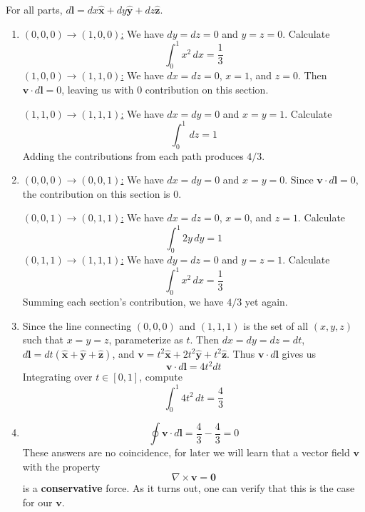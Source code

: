 \documentclass[a4paper]{article}
\begin{document}
For all parts, \( d \pmb{l} = dx \pmb{\hat{x}} + dy \pmb{\hat{y}} + dz \pmb{\hat{z}} \).

\begin{enumerate}[label=(\alph*)]
	\item \underline{\( \!\left( 0,0,0 \right) \rightarrow \!\left( 1,0,0 \right) \):} We have \( dy = dz = 0 \) and \( y = z = 0 \). Calculate
	\[
		\int^{1}_{0} x^{2} \, dx = \frac{1}{3}
	\]
	\underline{\( \!\left( 1,0,0 \right) \rightarrow \!\left( 1,1,0 \right) \):} We have \( dx = dz = 0 \), \( x = 1 \), and \( z = 0 \). Then \( \pmb{v} \cdot d \pmb{l} = 0 \), leaving us with \( 0 \) contribution on this section.

	\underline{\( \!\left( 1,1,0 \right) \rightarrow \!\left( 1,1,1 \right) \):} We have \( dx = dy = 0 \) and \( x = y = 1 \). Calculate
	\[
		\int^{1}_{0} \, dz = 1  
	\]
	Adding the contributions from each path produces \( 4 / 3 \).
	\item \underline{\( \!\left( 0,0,0 \right) \rightarrow \!\left( 0,0,1 \right) \):} We have \( dx = dy = 0 \) and \( x = y = 0 \). Since \( \pmb{v} \cdot d \pmb{l} = 0 \), the contribution on this section is \( 0 \).	

	\underline{\( \!\left( 0,0,1 \right) \rightarrow \!\left( 0,1,1 \right) \):} We have \( dx = dz = 0 \), \( x = 0 \), and \( z = 1 \). Calculate
	\[
		\int^{1}_{0} 2y \, dy = 1
	\]
	\underline{\( \!\left( 0,1,1 \right) \rightarrow \!\left( 1,1,1 \right) \):} We have \( dy = dz = 0 \) and \( y = z = 1 \). Calculate
	\[
		\int^{1}_{0} x^{2} \, dx = \frac{1}{3}  
	\]
	Summing each section's contribution, we have \( 4 / 3 \) yet again.
	\item Since the line connecting \( \!\left( 0,0,0 \right) \) and \( \!\left( 1,1,1 \right) \) is the set of all \( \!\left( x,y,z \right) \) such that \( x = y = z \), parameterize as \( t \). Then \( dx = dy = dz = dt \), \( d \pmb{l} = dt \!\left( \pmb{\hat{x}} + \pmb{\hat{y}} + \pmb{\hat{z}} \right) \), and \( \pmb{v} = t^{2}\pmb{\hat{x}} + 2t^{2}\pmb{\hat{y}} + t^{2}\pmb{\hat{z}} \). Thus \( \pmb{v} \cdot d \pmb{l} \) gives us
	\[
		\pmb{v} \cdot d \pmb{l} = 4t^{2}dt
	\]
	Integrating over \( t \in \!\left[ 0,1 \right] \), compute
	\[
	 	\int^{1}_{0} 4t^{2} \, dt = \frac{4}{3} 
	\]
	\item \[
		\oint \pmb{v} \cdot d \pmb{l} = \frac{4}{3} - \frac{4}{3} = 0
	\]
	These answers are no coincidence, for later we will learn that a vector field \( \pmb{v} \) with the property
	\[
		\nabla \times \pmb{v} = \pmb{0}
	\]
	is a \textbf{conservative} force. As it turns out, one can verify that this is the case for our \( \pmb{v} \).
\end{enumerate}
\end{document}
